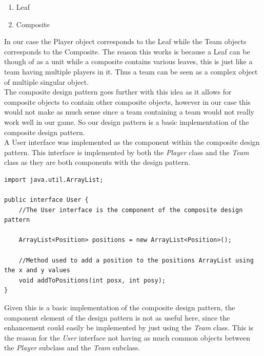 \documentclass[a4paper,12pt]{extarticle}
\begin{document}
\begin{enumerate}
\item Leaf
\item Composite
\end{enumerate}

\noindent In our case the Player object corresponds to the Leaf while the Team objects  corresponds to the Composite. The reason this works is because a Leaf can be though of as a unit while a composite contains various leaves, this is just like a team having multiple players in it. Thus a team can be seen as a complex object of multiple singular object.\\

\noindent The composite design pattern goes further with this idea as it allows for composite objects to contain other composite objects, however in our case this would not make as much sense since a team containing a team would not really work well in our game. So our design pattern is a basic implementation of the composite design pattern.\\

\noindent A User interface was implemented as the component within the composite design pattern. This interface is implemented by both the \textit{Player} class and the \textit{Team} class as they are both components with the design pattern.\\

\vspace{-1mm}
\begin{lstlisting}
import java.util.ArrayList;

public interface User {
    //The User interface is the component of the composite design pattern

    ArrayList<Position> positions = new ArrayList<Position>();

    //Method used to add a position to the positions ArrayList using the x and y values
    void addToPositions(int posx, int posy);
}
\end{lstlisting}
\vspace{-1mm}

\noindent Given this is a basic implementation of the composite design pattern, the component element of the design pattern is not as useful here, since the enhancement could easily be implemented by just using the \textit{Team} class. This is the reason for the \textit{User} interface not having as much common objects between the \textit{Player} subclass and the \textit{Team} subclass.\\
\end{document}
